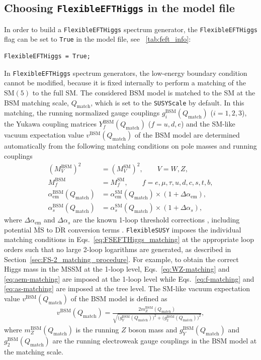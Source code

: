 \documentclass[final,3p,11pt,pdflatex]{elsarticle}
\makeatletter
\newcommand{\fs}{\texttt{FlexibleSUSY}\@\xspace}
\newcommand{\feft}{\texttt{Flex\-ib\-le\-EFT\-Higgs}\@\xspace}
\newcommand{\code}[1]{\lstinline|#1|}  %
\newcommand{\ol}[1]{\overline{#1}}
\newcommand{\MSbar}{\ensuremath{\ol{\text{MS}}}\xspace}
\newcommand{\DRbar}{\ensuremath{\ol{\text{DR}}}\xspace}
\newcommand{\SM}{\ensuremath{\text{SM}}\xspace}
\newcommand{\BSM}{\ensuremath{\text{BSM}}\xspace}
\newcommand{\Qmatch}{\ensuremath{Q_\text{match}}}
\newcommand{\secref}[1]{Section~\ref{#1}}
\newcommand{\tabref}[1]{\tablename~\ref{#1}}
\def\as{\alpha_s}
\def\aem{\alpha_{\text{em}}}
\makeatother
\begin{document}
\subsection{Choosing \feft in the model file}

In order to build a \feft spectrum generator, the
\code{FlexibleEFTHiggs} flag can be set to \code{True} in the model
file, see \tabref{tab:feft_info}:
%
\begin{lstlisting}
FlexibleEFTHiggs = True;
\end{lstlisting}
%
In \feft spectrum generators, the low-energy boundary condition cannot
be modified, because it is fixed internally to perform a matching of
the $\SM(5)$ to the full SM\@.  The considered \BSM model is
matched to the SM at the \BSM matching scale, $\Qmatch$,
which is set to the \code{SUSYScale} by default.  In this matching,
the running normalized gauge couplings $g_i^\BSM(\Qmatch)$
($i=1,2,3$), the Yukawa coupling matrices $Y_f^\BSM(\Qmatch)$
($f=u,d,e$) and the SM-like vacuum expectation value $v^\BSM(\Qmatch)$
of the \BSM model are determined automatically from the following matching
conditions on pole masses and running couplings
%
\begin{subequations}
\begin{align}
  (M_V^\BSM)^2 &= (M_V^\SM)^2, \qquad V = W, Z,
  \label{eq:WZ-matching} \\
  M_f^\BSM &= M_f^\SM, \qquad f = e, \mu, \tau, u, d, c, s, t, b,
  \label{eq:f-matching} \\
  \aem^\BSM(\Qmatch) &= \aem^\SM(\Qmatch)\times (1 + \Delta\aem),
  \label{eq:aem-matching} \\
  \as^\BSM(\Qmatch) &= \as^\SM(\Qmatch)\times (1 + \Delta\as),
  \label{eq:as-matching}
\end{align}%
\label{eq:FSEFTHiggs_matching}%
\end{subequations}%
%
where $\Delta\aem$ and $\Delta\as$ are the known 1-loop
threshold corrections \cite{Hall:1980kf}, including potential \MSbar
to \DRbar conversion terms \cite{Martin:1993yx}.
\fs imposes the individual matching conditions in
Eqs.~\eqref{eq:FSEFTHiggs_matching} at the appropriate loop orders
such that no large 2-loop logarithms are generated, as
described in \secref{sec:FS-2_matching_procedure}.  For example, to
obtain the correct Higgs mass in the MSSM at the 1-loop level,
Eqs.~\eqref{eq:WZ-matching} and \eqref{eq:aem-matching} are imposed at
the 1-loop level while Eqs.~\eqref{eq:f-matching} and
\eqref{eq:as-matching} are imposed at the tree level.  The SM-like
vacuum expectation value $v^\BSM(\Qmatch)$ of the \BSM model is
defined as
%
\begin{align}
  v^\BSM(\Qmatch) = \frac{2 m_Z^\BSM(\Qmatch)}{\sqrt{\big(g_Y^\BSM(\Qmatch)\big)^2 + \big(g_2^\BSM(\Qmatch)\big)^2}},
  \label{eq:feft_vev_definition}
\end{align}
%
where $m_Z^\BSM(\Qmatch)$ is the running $Z$ boson mass and
$g_Y^\BSM(\Qmatch)$ and $g_2^\BSM(\Qmatch)$ are the running
electroweak gauge couplings in the \BSM model at the matching scale.
\end{document}
